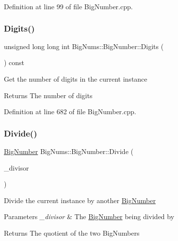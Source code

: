 Definition at line 99 of file Big\+Number.\+cpp.

\mbox{\label{class_big_nums_1_1_big_number_ae35841de4a2037e6edc02bcbf40600ba}} 
\subsubsection{\texorpdfstring{Digits()}{Digits()}}
{\footnotesize\ttfamily unsigned long long int Big\+Nums\+::\+Big\+Number\+::\+Digits (\begin{DoxyParamCaption}{ }\end{DoxyParamCaption}) const}

Get the number of digits in the current instance \begin{DoxyReturn}{Returns}
The number of digits 
\end{DoxyReturn}


Definition at line 682 of file Big\+Number.\+cpp.

\mbox{\label{class_big_nums_1_1_big_number_a55f83d787d248c55d9df8347c2fcb7ed}} 
\subsubsection{\texorpdfstring{Divide()}{Divide()}}
{\footnotesize\ttfamily \mbox{\hyperlink{class_big_nums_1_1_big_number}{Big\+Number}} Big\+Nums\+::\+Big\+Number\+::\+Divide (\begin{DoxyParamCaption}\item[{const \mbox{\hyperlink{class_big_nums_1_1_big_number}{Big\+Number}} \&}]{\+\_\+divisor }\end{DoxyParamCaption})}

Divide the current instance by another \mbox{\hyperlink{class_big_nums_1_1_big_number}{Big\+Number}} 
\begin{DoxyParams}{Parameters}
{\em \+\_\+divisor} & The \mbox{\hyperlink{class_big_nums_1_1_big_number}{Big\+Number}} being divided by \\
\hline
\end{DoxyParams}
\begin{DoxyReturn}{Returns}
The quotient of the two Big\+Numbers 
\end{DoxyReturn}


